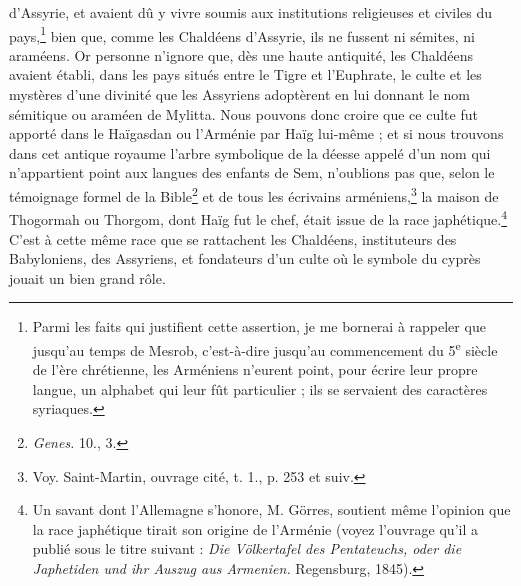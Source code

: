 \documentclass{article}
\begin{document}
d'Assyrie, et avaient dû y vivre soumis aux institutions religieuses et civiles du pays,\footnote{Parmi les faits qui justifient cette assertion, je me bornerai à rappeler que jusqu'au temps de Mesrob, c'est-à-dire jusqu'au commencement du 5\textsuperscript{e} siècle de l'ère chrétienne, les Arméniens n'eurent point, pour écrire leur propre langue, un alphabet qui leur fût particulier ; ils se servaient des caractères syriaques.} bien que, comme les Chaldéens d'Assyrie, ils ne fussent ni sémites, ni araméens. Or personne n'ignore que, dès une haute antiquité, les Chaldéens avaient établi, dans les pays situés entre le Tigre et l'Euphrate, le culte et les mystères d'une divinité que les Assyriens adoptèrent en lui donnant le nom sémitique ou araméen de Mylitta. Nous pouvons donc croire que ce culte fut apporté dans le Haïgasdan ou l'Arménie par Haïg lui-même ; et si nous trouvons dans cet antique royaume l'arbre symbolique de la déesse appelé d'un nom qui n'appartient point aux langues des enfants de Sem, n'oublions pas que, selon le témoignage formel de la Bible\footnote{\emph{Genes.} 10., 3.} et de tous les écrivains arméniens,\footnote{Voy. Saint-Martin, ouvrage cité, t. 1., p. 253 et suiv.} la maison de Thogormah ou Thorgom, dont Haïg fut le chef, était issue de la race japhétique.\footnote{Un savant dont l'Allemagne s'honore, M. Görres, soutient même l'opinion que la race japhétique tirait son origine de l'Arménie (voyez l'ouvrage qu'il a publié sous le titre suivant : \emph{Die Völkertafel des Pentateuchs, oder die Japhetiden und ihr Auszug aus Armenien.} Regensburg, 1845).} C'est à cette même race que se rattachent les Chaldéens, instituteurs des Babyloniens, des Assyriens, et fondateurs d'un culte où le symbole du cyprès jouait un bien grand rôle.
\end{document}
